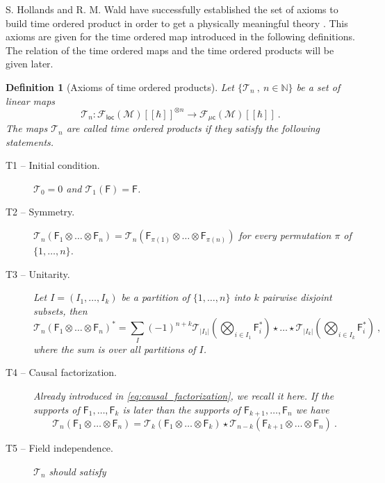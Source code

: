 \documentclass[11pt]{book}
\newcommand{\loc}{\mathsf{loc}}
\newcommand{\muc}{\mu\csf}
\newcommand{\abs}[1]{\left|#1\right|}
\newcommand{\Fcal}{\mathcal{F}}
\newcommand{\Mcal}{\mathcal{M}}
\newcommand{\Tcal}{\mathcal{T}}
\newcommand{\Nbb}{\mathbb{N}}
\newcommand{\Fsf}{\mathsf{F}}
\newcommand{\csf}{\mathsf{c}}
\theoremstyle{break}
\newtheorem{definition}{Definition}[chapter]
\begin{document}
\bigskip


S. Hollands and R. M. Wald have successfully established the set of axioms to build time ordered product in order to get a physically meaningful theory \cite{hollands_local_2001,hollands_existence_2002}. This axioms are given for the time ordered map introduced in the following definitions. The relation of the time ordered maps and the time ordered products will be given later.


\begin{definition}[Axioms of time ordered products]
Let $\{\Tcal_n \ , \ n \in \Nbb\}$ be a set of linear maps 
%
\begin{equation*}
\Tcal_n : \Fcal_\loc(\Mcal)[[\hbar]]^{\otimes n} \to \Fcal_{\muc}(\Mcal)[[\hbar]] \ . 
\end{equation*}
%
The maps $\Tcal_n$ are called time ordered products if they satisfy the following statements.
%
\begin{description}
\item[T1 -- Initial condition.]\label{item:T1} $\Tcal_0 = 0$ and $\Tcal_1(\Fsf) = \Fsf$.
%
\item[T2 -- Symmetry.]\label{item:T2} $\Tcal_n(\Fsf_1\otimes\dots\otimes\Fsf_n) = \Tcal_n(\Fsf_{\pi(1)}\otimes\dots\otimes\Fsf_{\pi(n)})$ for every permutation $\pi$ of $\{1,\dots,n\}$.
%
\item[T3 -- Unitarity.]\label{item:T3} Let $I=(I_1,\dots,I_k)$ be a partition of $\{1,\dots,n\}$ into $k$ pairwise disjoint subsets, then
%
\begin{equation*}
\Tcal_n(\Fsf_1\otimes\dots\otimes\Fsf_n)^\ast = \sum_{I} (-1)^{n+k} \Tcal_{\abs{I_1}}\left(\bigotimes_{i\in I_1} \Fsf_i^\ast \right) \star \dots \star \Tcal_{\abs{I_k}}\left(\bigotimes_{i\in I_k} \Fsf_i^\ast \right) \ ,
\end{equation*}
%
where the sum is over all partitions of $I$.
%
\item[T4 -- Causal factorization.]\label{item:T4} Already introduced in \eqref{eq:causal_factorization}, we recall it here. If the supports of $\Fsf_1,\dots,\Fsf_k$ is later than the supports of $\Fsf_{k+1} , \dots , \Fsf_{n}$ we have
\begin{equation*}
\Tcal_n(\Fsf_1\otimes\dots\otimes\Fsf_n) = \Tcal_k(\Fsf_1\otimes\dots\otimes\Fsf_k) \star \Tcal_{n-k} (\Fsf_{k+1}\otimes\dots\otimes\Fsf_n) \ .
\end{equation*}
%
\item[T5 -- Field independence.]\label{item:T5} $\Tcal_n$ should satisfy
%
\begin{equation*}

\end{equation*}
\end{description}
\end{definition}
\end{document}
